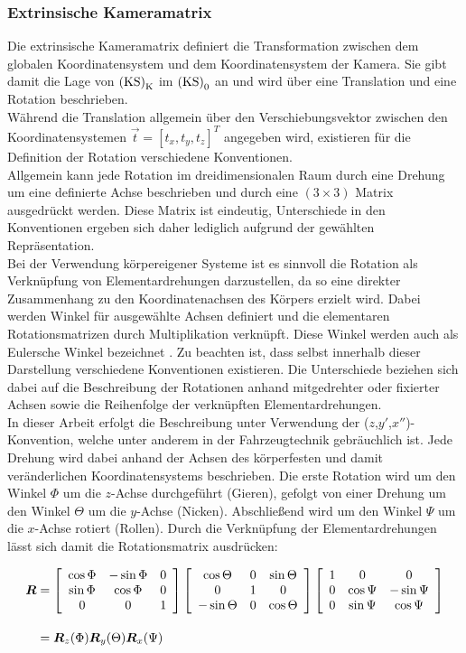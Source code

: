 \subsubsection{Extrinsische Kameramatrix}
Die extrinsische Kameramatrix definiert die Transformation zwischen dem globalen Koordinatensystem und dem Koordinatensystem der Kamera. Sie gibt damit die Lage von ${\mathrm{(KS)}}_{\mathrm{K}}$ im ${\mathrm{(KS)}}_{\mathrm{0}}$ an und wird über eine Translation und eine Rotation beschrieben.\\
Während die Translation allgemein über den Verschiebungsvektor zwischen den Koordinatensystemen $\vec{t} = [t_x, t_y, t_z]^T$ angegeben wird, existieren für die Definition der Rotation verschiedene Konventionen.\\

Allgemein kann jede Rotation im dreidimensionalen Raum durch eine Drehung um eine definierte Achse beschrieben und durch eine $(3 \times 3)$ Matrix ausgedrückt werden. Diese Matrix ist eindeutig, Unterschiede in den Konventionen ergeben sich daher lediglich aufgrund der gewählten Repräsentation.\\
Bei der Verwendung körpereigener Systeme ist es sinnvoll die Rotation als Verknüpfung von Elementardrehungen darzustellen, da so eine direkter Zusammenhang zu den Koordinatenachsen des Körpers erzielt wird. Dabei werden Winkel für ausgewählte Achsen definiert und die elementaren Rotationsmatrizen durch Multiplikation verknüpft. Diese Winkel werden auch als Eulersche Winkel bezeichnet \cite{Foley1990}. Zu beachten ist, dass selbst innerhalb dieser Darstellung verschiedene Konventionen existieren. Die Unterschiede beziehen sich dabei auf die Beschreibung der Rotationen anhand mitgedrehter oder fixierter Achsen sowie die Reihenfolge der verknüpften Elementardrehungen.\\

In dieser Arbeit erfolgt die Beschreibung unter Verwendung der ($z$,$y'$,$x''$)-Konvention, welche unter anderem in der Fahrzeugtechnik gebräuchlich ist. Jede Drehung wird dabei anhand der Achsen des körperfesten und damit veränderlichen Koordinatensystems beschrieben. Die erste Rotation wird um den Winkel $\Phi$ um die $z$-Achse durchgeführt (Gieren), gefolgt von einer Drehung um den Winkel $\Theta$ um die $y$-Achse (Nicken). Abschließend wird um den Winkel $\Psi$ um die $x$-Achse rotiert (Rollen). Durch die Verknüpfung der Elementardrehungen lässt sich damit die Rotationsmatrix ausdrücken:

\begin{equation}
\begin{split}
\mbox{\boldmath{$R$}} & = \left[ \begin{array}{ccc}  \cos{\Phi} & -\sin{\Phi} & 0 \\ \sin{\Phi} & \cos{\Phi} & 0 \\ 0 & 0 & 1  \end{array} \right] \left[ \begin{array}{ccc}  \cos{\Theta} & 0 & \sin{\Theta} \\ 0 & 1 & 0 \\ -\sin{\Theta} & 0 & \cos{\Theta}  \end{array} \right] \left[ \begin{array}{ccc}  1 & 0 & 0 \\ 0 & \cos{\Psi} & -\sin{\Psi} \\ 0 & \sin{\Psi} & \cos{\Psi}  \end{array} \right] \\[1em]
& = \mbox{\boldmath{$R$}}_z(\Phi) \mbox{\boldmath{$R$}}_y(\Theta) \mbox{\boldmath{$R$}}_x(\Psi)
\end{split}
\end{equation}

